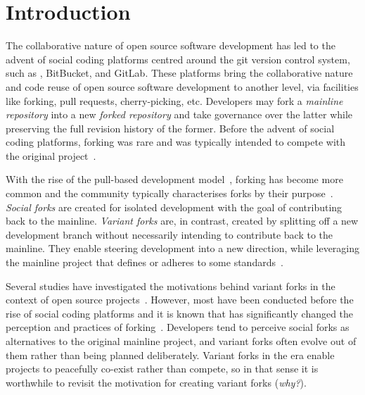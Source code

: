 \section{Introduction}
\label{sec:intro}

The collaborative nature of open source software development has led to the advent of social coding platforms centred around the git version control system, such as \gh, BitBucket, and GitLab.
These platforms bring the collaborative nature and code reuse of open source software development to another level, via facilities like forking, pull requests, cherry-picking, etc.
Developers may fork a \textit{mainline repository} into a new \textit{forked repository} and take governance over the latter while preserving the full revision history of the former.
Before the advent of social coding platforms, forking was rare and was typically intended to compete with the original project~\cite{Linus:2012Perspectives,Gregorio:2012,Viseur:2012Forks,Linus:2013CodeForking,Linus:2011ToFork,Gamalielsson:2014Sustainability}.

With the rise of the pull-based development model~\cite{Gousios:2014ICSE}, forking has become more common and the community typically characterises forks by their purpose~\cite{Zhou:2020}.
\textit{Social forks} are created for isolated development with the goal of contributing back to the mainline.
\textit{Variant forks} are, in contrast, created by splitting off a new development branch without necessarily intending to contribute back to the mainline.
They enable steering development into a new direction, while leveraging the mainline project that defines or adheres to some standards~\cite{sung:ICSE:2020}.


Several studies have investigated the motivations behind variant forks in the context of open source projects~\cite{Linus:2012Perspectives,Gregorio:2012,Viseur:2012Forks,Linus:2013CodeForking,Linus:2011ToFork,Gamalielsson:2014Sustainability}.
However, most have been conducted before the rise of social coding platforms and it is known that \gh has significantly changed the perception and practices of forking~\cite{Zhou:2020}.
Developers tend to perceive social forks as alternatives to the original mainline project, and variant forks often evolve out of them rather than being planned deliberately.
Variant forks in the \gh era enable projects to peacefully co-exist rather than compete, so in that sense it is worthwhile to revisit the motivation for creating variant forks (\textit{why?}).

